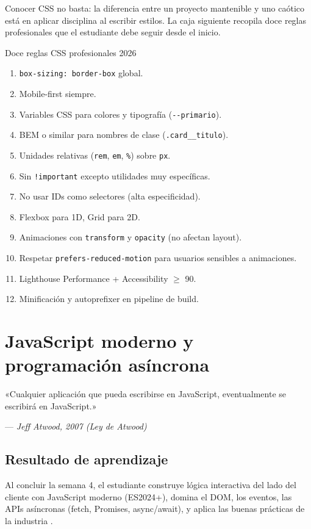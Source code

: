 \documentclass[11pt,a4paper,openany]{book}
\begin{document}
Conocer CSS no basta: la diferencia entre un proyecto
mantenible y uno caótico está en aplicar disciplina al escribir
estilos. La caja siguiente recopila doce reglas profesionales que
el estudiante debe seguir desde el inicio.


\begin{cajabuenas}{Doce reglas CSS profesionales 2026}
\begin{enumerate}
\item \texttt{box-sizing: border-box} global.
\item Mobile-first siempre.
\item Variables CSS para colores y tipografía (\texttt{-{}-primario}).
\item BEM o similar para nombres de clase
(\texttt{.card\_\_titulo}).
\item Unidades relativas (\texttt{rem}, \texttt{em}, \texttt{\%})
sobre \texttt{px}.
\item Sin \texttt{!important} excepto utilidades muy específicas.
\item No usar IDs como selectores (alta especificidad).
\item Flexbox para 1D, Grid para 2D.
\item Animaciones con \texttt{transform} y \texttt{opacity}
(no afectan layout).
\item Respetar \texttt{prefers-reduced-motion} para usuarios sensibles
a animaciones.
\item Lighthouse Performance + Accessibility $\geq$ 90.
\item Minificación y autoprefixer en pipeline de build.
\end{enumerate}
\end{cajabuenas}


\chapter{JavaScript moderno y programación asíncrona}
\label{cap:semana4}

\epigraph{«Cualquier aplicación que pueda escribirse en JavaScript,
eventualmente se escribirá en JavaScript.»}{--- \textit{Jeff
Atwood, 2007 (Ley de Atwood)}}

\section*{Resultado de aprendizaje}
Al concluir la semana 4, el estudiante construye lógica interactiva
del lado del cliente con JavaScript moderno (ES2024+), domina el DOM,
los eventos, las APIs asíncronas (fetch, Promises, async/await), y
aplica las buenas prácticas de la industria
\cite{flanagan2020javascript,crockford2008javascript}.
\end{document}
